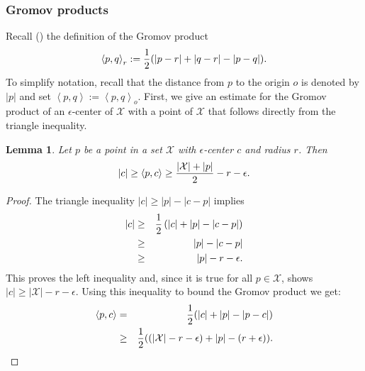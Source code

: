 \documentclass[11pt,letterpaper]{amsart}
\newtheorem{lemma}[theorem]{Lemma}
\begin{document}
\subsubsection*{Gromov products}
Recall (\cite{gromovhyperbolic,cdp,bhbook}) the definition of the Gromov product
$$
\left<p,q\right>_r:={1\over 2}(|p-r|+|q-r|-|p-q|).
$$
To simplify notation, recall that the distance from $p$ to the origin $o$ is denoted by $|p|$ and set $\left<p,q\right>:=\left<p,q\right>_o$. First, we give an estimate for the Gromov product of an $\epsilon$-center of $\mathcal X$ with a point of $\mathcal X$ that follows directly from the triangle inequality.
\begin{lemma}
\label{fellowtravel1}
Let $p$ be a point in a set $\mathcal X$ with $\epsilon$-center $c$ and radius $r$. Then
$$
|c|\geq\left<p,c\right>\geq{|\mathcal X|+|p|\over 2}-r-\epsilon.
$$
\end{lemma}
\begin{proof}
The triangle inequality $|c|\geq|p|-|c-p|$ implies
\begin{eqnarray*}
|c|&\geq&{1\over 2}\left(|c|+|p|-|c-p|\right)\\
&\geq&|p|-|c-p|\\
&\geq&|p|-r-\epsilon.
\end{eqnarray*}
This proves the left inequality and, since it is true for all $p\in\mathcal X$, shows $|c|\geq|\mathcal X|-r-\epsilon$. Using this inequality to bound the Gromov product we get:
\begin{eqnarray*}
\left<p,c\right>&=&{1\over 2}(|c|+|p|-|p-c|)\\
&\geq&{1\over 2}((|\mathcal X|-r-\epsilon)+|p|-(r+\epsilon)).
\end{eqnarray*}
\end{proof}
\end{document}

